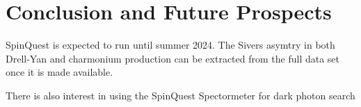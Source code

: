 \documentclass[../main.tex]{subfiles}
\begin{document}
\ifSubfilesClassLoaded{
	\mainmatter
	\setcounter{chapter}{5}
}{}

\chapter{Conclusion and Future Prospects}
\label{ch:conclusion}
SpinQuest is expected to run until summer 2024. The Sivers
asymtry in both Drell-Yan and charmonium production can be extracted from the full
data set once it is made available.

There is also interest in using the SpinQuest Spectormeter for dark photon search
\cite{apyan2022}

\ifSubfilesClassLoaded{ \printbibliography[heading=bibintoc,title={References}]}{}
\end{document}
